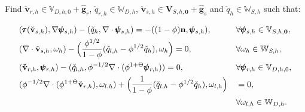\documentclass[usenames,dvipsnames,letterpaper,landscape,final]{slides}
\begin{document}

\begin{myslide}
Find $\check{\mathbf{v}}_{r,h} \in \mathbb{V}_{D,h,0} + \hat{\mathbf{g}}_r$, $\check{q}_{r,h} \in \mathbb{W}_{D,h}$, 
$\check{\mathbf{v}}_{s,h} \in \mathbf{V}_{S,h,\mathbf{0}} + \hat{\mathbf{g}}_s$ and $\check{q}_h \in \mathbb{W}_{S,h}$ such that:

\begin{alignat}{2}
		  \label{eq:weak_stokes}
		  &(\pmb{\tau}(\check{\bold{v}}_{s,h}),\nabla \pmb{\psi}_{s,h}) - (\check{q}_h, \nabla \cdot \pmb{\psi}_{s,h}) = -((1-\phi)\bold{n}, \pmb{\psi}_{s,h}), &&\forall\pmb{\psi}_{s,h} \in \mathbb{V}_{S,h,\mathbf{0}},\\
		  \label{eq:weak_compaction}
		  &(\nabla \cdot \check{\bold{v}}_{s,h}, \omega_h)  - \Big(\frac{\phi^{1/2}}{1-\phi} (\check{q}_{l,h} - \phi^{1/2}\check{q}_h), \omega_h \Big) = 0, &&\forall \omega_h \in \mathbb{W}_{S,h},\\
					\label{eq:weak_darcy}
					 &(\bold{\check{v}}_{r,h},\pmb{\psi}_{r,h})  - (\check{q}_{l,h},\phi^{-1/2} \nabla \cdot (\phi^{1+\Theta}\pmb{\psi}_{r,h})) = 0, &&\forall \pmb{\psi}_{r,h} \in \mathbb{V}_{D,h,0},\\
					 \nonumber
					 &(\phi^{-1/2} \nabla \cdot (\phi^{1+\Theta}\check{\bold{v}}_{r,h}),\omega_{l,h}) + \Big(\frac{1}{1-\phi}(\check{q}_{l,h} - \phi^{1/2}\check{q}_h),\omega_{l,h} \Big) &&= 0, \\
					 \label{eq:weak_continuous}
		  &					 &&\forall \omega_{l,h} \in 
		  \mathbb{W}_{D,h}.
\end{alignat}

\end{myslide}
\end{document}
